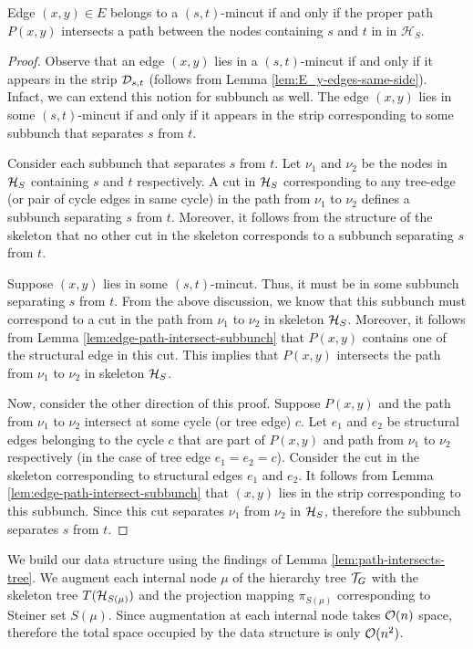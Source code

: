 \begin{lemma} \label{lem:path-intersects-tree}
 Edge $(x,y)\in E$ belongs to a $(s,t)$-mincut if and only if the proper path $P(x,y)$ intersects a path between the nodes containing $s$ and $t$ in in $\mathcal H_{S}$.
\end{lemma}
\begin{proof}
Observe that an edge $(x,y)$ lies in a $(s,t)$-mincut if and only if it appears in the strip ${\cal D}_{s,t}$ (follows from Lemma \ref{lem:E_y-edges-same-side}). Infact, we can extend this notion for subbunch as well. The edge $(x,y)$ lies in some $(s,t)$-mincut if and only if it appears in the strip corresponding to some subbunch that separates $s$ from $t$.

Consider each subbunch that separates $s$ from $t$. Let $\nu_1$ and $\nu_2$ be the nodes in ${\cal H}_S$ containing $s$ and $t$ respectively. A cut in ${\cal H}_S$ corresponding to any tree-edge (or pair of cycle edges in same cycle) in the path from $\nu_1$ to $\nu_2$ defines a subbunch separating $s$ from $t$. Moreover, it follows from the structure of the skeleton that no other cut in the skeleton corresponds to a subbunch separating $s$ from $t$. 

Suppose $(x,y)$ lies in some $(s,t)$-mincut. Thus, it must be in some subbunch separating $s$ from $t$. From the above discussion, we know that this subbunch must correspond to a cut in the path from $\nu_1$ to $\nu_2$ in skeleton ${\cal H}_S$. Moreover, it follows from Lemma \ref{lem:edge-path-intersect-subbunch} that $P(x,y)$ contains one of the structural edge in this cut. This implies that $P(x,y)$ intersects the path from $\nu_1$ to $\nu_2$ in skeleton ${\cal H}_S$.

Now, consider the other direction of this proof. Suppose $P(x,y)$ and the path from $\nu_1$ to $\nu_2$ intersect at some cycle (or tree edge) $c$. Let $e_1$ and $e_2$ be structural edges belonging to the cycle $c$ that are part of $P(x,y)$ and path from $\nu_1$ to $\nu_2$ respectively (in the case of tree edge $e_1=e_2=c$). Consider the cut in the skeleton corresponding to structural edges $e_1$ and $e_2$. It follows from Lemma \ref{lem:edge-path-intersect-subbunch} that $(x,y)$ lies in the strip corresponding to this subbunch. Since this cut separates $\nu_1$ from $\nu_2$ in ${\cal H}_S$, therefore the subbunch separates $s$ from $t$.
\end{proof}

We build our data structure using the findings of Lemma \ref{lem:path-intersects-tree}. We augment each internal node $\mu$ of the hierarchy tree ${\cal T}_G$ with the skeleton tree $T({\cal H}_{S(\mu)})$ and the projection mapping ${\pi}_{S(\mu)}$ corresponding to Steiner set $S(\mu)$. Since augmentation at each internal node takes ${\cal O}(n)$ space, therefore the total space occupied by the data structure is only ${\cal O}(n^2)$.


